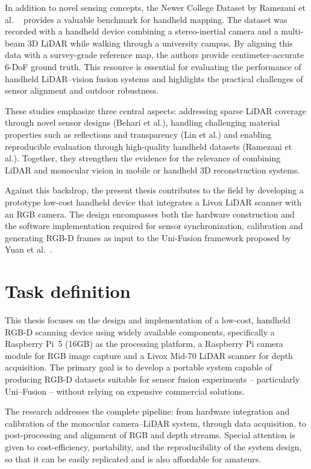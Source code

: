 \documentclass[english, bachelor, utf8]{base/thesis_telematics}
\begin{document}
In addition to novel sensing concepts, the Newer College Dataset by Ramezani et al.
~\cite{ramezani2019newer} provides a valuable benchmark for handheld mapping. The dataset was 
recorded with a handheld device combining a stereo-inertial camera and a multi-beam 3D LiDAR while 
walking through a university campus. By aligning this data with a survey-grade reference map, the 
authors provide centimeter-accurate 6-DoF ground truth. This resource is essential for evaluating 
the performance of handheld LiDAR--vision fusion systems and highlights the practical challenges of 
sensor alignment and outdoor robustness.

These studies emphasize three central aspects: addressing sparse LiDAR coverage through novel sensor 
designs (Behari et al.), handling challenging material properties such as reflections and 
transparency (Lin et al.) and enabling reproducible evaluation through high-quality handheld 
datasets (Ramezani et al.). Together, they strengthen the evidence for the relevance of combining 
LiDAR and monocular vision in mobile or handheld 3D reconstruction systems.

Against this backdrop, the present thesis contributes to the field by developing a prototype low-cost handheld device 
that integrates a Livox LiDAR scanner with an RGB camera. The design encompasses both the hardware construction 
and the software implementation required for sensor synchronization, calibration and generating RGB-D frames
as input to the Uni-Fusion framework proposed by Yuan et al.~\cite{yuan2024uni}.

\section*{Task definition}
This thesis focuses on the design and implementation of a low-cost, handheld RGB-D scanning device using
widely available components, specifically a Raspberry Pi~5 (16GB) as the processing platform, a Raspberry Pi camera
module for RGB image capture and a Livox Mid-70 LiDAR scanner for depth acquisition. The primary goal is to
develop a portable system capable of producing RGB-D datasets suitable for sensor fusion experiments -- particularly Uni--Fusion -- without relying on expensive commercial solutions.

The research addresses the complete pipeline: from hardware integration and calibration of the monocular
camera--LiDAR system, through data acquisition, to post-processing and alignment of RGB
and depth streams. Special attention is given to cost-efficiency, portability, and the reproducibility of the system
design, so that it can be easily replicated and is also affordable for amateurs.
\end{document}
